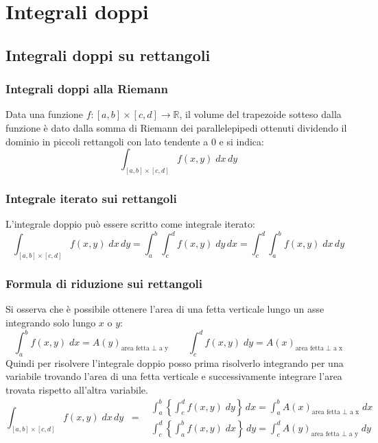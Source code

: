 \documentclass[a4paper]{article}
\newcommand\R{\mathbb{R}}     %
\begin{document}
\newpage


\section{Integrali doppi}
\subsection{Integrali doppi su rettangoli}
\subsubsection*{Integrali doppi alla Riemann}
Data una funzione \(f:[a,b] \times [c,d] \to \R\), il volume del trapezoide sotteso dalla funzione è dato dalla somma di Riemann
dei parallelepipedi ottenuti dividendo il dominio in piccoli rettangoli con lato tendente a 0 e si indica:
\[\int_{[a,b] \times [c,d]} f(x,y) \; dx \, dy\]

\subsubsection*{Integrale iterato sui rettangoli}
L'integrale doppio può essere scritto come integrale iterato:
\[\int_{[a,b] \times [c,d]} f(x,y) \; dx \, dy = \int_{a}^{b} \int_{c}^{d} f(x,y) \; dy \, dx = \int_{c}^{d} \int_{a}^{b} f(x,y) \; dx \, dy\]

\subsubsection*{Formula di riduzione sui rettangoli}
Si osserva che è possibile ottenere l'area di una fetta verticale lungo un asse integrando solo lungo \(x\) o \(y\):
\[\int_{a}^{b} f(x,y) \; dx = {A(y)}_\text{area fetta \(\perp\) a y} \qquad \int_{c}^{d} f(x,y) \; dy = {A(x)}_\text{area fetta \(\perp\) a x}\]
Quindi per risolvere l'integrale doppio posso prima risolverlo integrando per una variabile trovando l'area di una fetta verticale
e successivamente integrare l'area trovata rispetto all'altra variabile.
\[\int_{[a,b] \times [c,d]} f(x,y) \; dx \, dy \;\; = \;\; \begin{matrix}
	\displaystyle \int_{a}^{b} \left\{ \int_{c}^{d} f(x,y) \; dy \right\} \, dx = \int_{a}^{b} {A(x)}_\text{area fetta \(\perp\) a x} \; dx \\[15pt]
	\displaystyle \int_{c}^{d} \left\{ \int_{a}^{b} f(x,y) \; dx \right\} \, dy = \int_{c}^{d} {A(y)}_\text{area fetta \(\perp\) a y} \; dy
\end{matrix}\]
\end{document}
